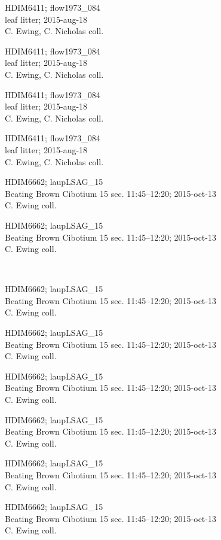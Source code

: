 \documentclass[2pt]{extarticle}
\begin{document}
\noindent
\parbox{0.16\textwidth}{\tiny \raggedright \rule[-0.3\baselineskip]{0pt}{10pt}HDIM6411; flow1973\_084\\ leaf litter; 2015-aug-18\\ C. Ewing, C. Nicholas coll.}
\parbox{0.16\textwidth}{\tiny \raggedright \rule[-0.3\baselineskip]{0pt}{10pt}HDIM6411; flow1973\_084\\ leaf litter; 2015-aug-18\\ C. Ewing, C. Nicholas coll.}
\parbox{0.16\textwidth}{\tiny \raggedright \rule[-0.3\baselineskip]{0pt}{10pt}HDIM6411; flow1973\_084\\ leaf litter; 2015-aug-18\\ C. Ewing, C. Nicholas coll.}
\parbox{0.16\textwidth}{\tiny \raggedright \rule[-0.3\baselineskip]{0pt}{10pt}HDIM6411; flow1973\_084\\ leaf litter; 2015-aug-18\\ C. Ewing, C. Nicholas coll.}
\parbox{0.16\textwidth}{\tiny \raggedright \rule[-0.3\baselineskip]{0pt}{10pt}HDIM6662; laupLSAG\_15\\ Beating Brown Cibotium 15 sec. 11:45--12:20; 2015-oct-13\\ C. Ewing coll.}
\parbox{0.16\textwidth}{\tiny \raggedright \rule[-0.3\baselineskip]{0pt}{10pt}HDIM6662; laupLSAG\_15\\ Beating Brown Cibotium 15 sec. 11:45--12:20; 2015-oct-13\\ C. Ewing coll.} \\ 
\vspace{0.001in} 

\noindent
\parbox{0.16\textwidth}{\tiny \raggedright \rule[-0.3\baselineskip]{0pt}{10pt}HDIM6662; laupLSAG\_15\\ Beating Brown Cibotium 15 sec. 11:45--12:20; 2015-oct-13\\ C. Ewing coll.}
\parbox{0.16\textwidth}{\tiny \raggedright \rule[-0.3\baselineskip]{0pt}{10pt}HDIM6662; laupLSAG\_15\\ Beating Brown Cibotium 15 sec. 11:45--12:20; 2015-oct-13\\ C. Ewing coll.}
\parbox{0.16\textwidth}{\tiny \raggedright \rule[-0.3\baselineskip]{0pt}{10pt}HDIM6662; laupLSAG\_15\\ Beating Brown Cibotium 15 sec. 11:45--12:20; 2015-oct-13\\ C. Ewing coll.}
\parbox{0.16\textwidth}{\tiny \raggedright \rule[-0.3\baselineskip]{0pt}{10pt}HDIM6662; laupLSAG\_15\\ Beating Brown Cibotium 15 sec. 11:45--12:20; 2015-oct-13\\ C. Ewing coll.}
\parbox{0.16\textwidth}{\tiny \raggedright \rule[-0.3\baselineskip]{0pt}{10pt}HDIM6662; laupLSAG\_15\\ Beating Brown Cibotium 15 sec. 11:45--12:20; 2015-oct-13\\ C. Ewing coll.}
\parbox{0.16\textwidth}{\tiny \raggedright \rule[-0.3\baselineskip]{0pt}{10pt}HDIM6662; laupLSAG\_15\\ Beating Brown Cibotium 15 sec. 11:45--12:20; 2015-oct-13\\ C. Ewing coll.} \\ 
\vspace{0.001in} 
\end{document}
